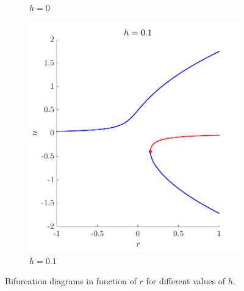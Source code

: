 \documentclass[a4paper,11pt]{article}
\begin{document}
\begin{figure}[H]
{\begin{subfigure}{0.43\linewidth}
		\caption{$h=0$}
		\label{fig:bifrxh0}
	\end{subfigure}
	\begin{subfigure}{0.43\linewidth}
		\centering
		\includegraphics[width=\textwidth]{bifrxh1.png}
		\caption{$h=0.1$}
	\end{subfigure}
	}
	\caption{Bifurcation diagrams in function of $r$ for different values of $h$.}
	\label{fig:bifrx}
\end{figure}
\end{document}
